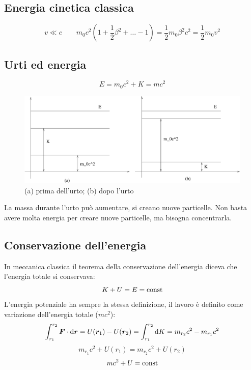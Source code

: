\subsection{Energia cinetica classica}
$$v\ll c\qquad m_0c^2\left(1+\frac{1}{2}\beta^2+\ldots-1\right)=\frac{1}{2}m_0\beta^2c^2=\frac{1}{2}m_0v^2$$
\subsection{Urti ed energia}
$$E=m_0c^2+K=mc^2$$
\begin{figure}[htbp]
   \centering
   \includegraphics[scale=0.5]{immagini/fisica1/urto_rel}
   \caption{(a) prima dell'urto; (b) dopo l'urto}
\end{figure}
La massa durante l'urto può aumentare, si creano nuove particelle. Non basta avere molta energia per creare nuove particelle, ma bisogna concentrarla.

\subsection{Conservazione dell'energia}
In meccanica classica il teorema della conservazione dell'energia diceva che l'energia totale si conservava:
$$K+U=E=\text{const}$$
L'energia potenziale ha sempre la stessa definizione, il lavoro è definito come variazione dell'energia totale ($mc^2$):
$$\int_{r_1}^{r_2}\boldsymbol{F}\cdot \mathrm{d}\boldsymbol{r}=U(\boldsymbol{r}_1)-U(\boldsymbol{r}_2)=\int_{r_1}^{r_2}\mathrm{d} K=m_{r_2}c^2-m_{r_1}c^2$$
$$m_{r_1}c^2+U(r_1)=m_{r_2}c^2+U(r_2)$$
$$mc^2+U=\text{const}$$

